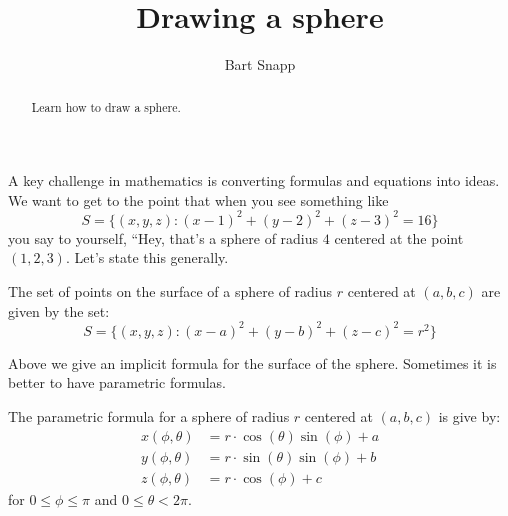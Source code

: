 \documentclass{ximera}
\author{Bart Snapp}
\title[Dig-In:]{Drawing a sphere}
\begin{document}
\begin{abstract}
  Learn how to draw a sphere.
\end{abstract}
\maketitle

A key challenge in mathematics is converting formulas and equations
into ideas. We want to get to the point that when you see something
like
\[
S = \{(x,y,z):(x-1)^2+(y-2)^2+(z-3)^2=16\}
\]
you say to yourself, ``Hey, that's a sphere of radius $4$ centered at
the point $(1,2,3)$. Let's state this generally.
\begin{theorem}
  The set of points on the surface of a sphere of radius $r$ centered
  at $(a,b,c)$ are given by the set:
  \[
  S = \{(x,y,z):(x-a)^2+(y-b)^2+(z-c)^2=r^2\}
  \]
\end{theorem}
Above we give an implicit formula for the surface of the
sphere. Sometimes it is better to have parametric formulas.
\begin{theorem}
  The parametric formula for a sphere of radius $r$ centered at
  $(a,b,c)$ is give by:
  \begin{align*}
    x(\phi,\theta) &=r\cdot\cos(\theta)\sin(\phi)+a\\
    y(\phi,\theta) &=r\cdot\sin(\theta)\sin(\phi)+b\\
    z(\phi,\theta) &=r\cdot\cos(\phi)+c
  \end{align*}
  for $0\le \phi\le \pi$ and $0\le\theta< 2\pi$.
\end{theorem}
\end{document}
